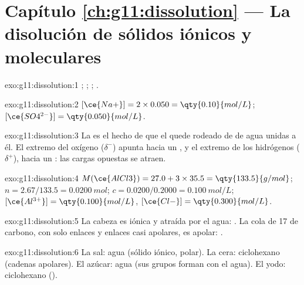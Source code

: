 \section*{Capítulo \ref{ch:g11:dissolution} --- La disolución de sólidos iónicos y moleculares}

\begin{solution}{exo:g11:dissolution:1}
;
;
;
.
\end{solution}

\begin{solution}{exo:g11:dissolution:2}
$[\ce{Na+}] = 2 \times 0.050 = \qty{0.10}{mol/L}$;
$[\ce{SO4^{2-}}] = \qty{0.050}{mol/L}$.
\end{solution}

\begin{solution}{exo:g11:dissolution:3}
La  es el hecho de que el  quede rodeado de  de
agua unidas a él. El extremo del oxígeno ($\delta^-$) apunta hacia un
, y el extremo de los hidrógenos ($\delta^+$), hacia un : las
cargas opuestas se atraen.
\end{solution}

\begin{solution}{exo:g11:dissolution:4}
$M(\ce{AlCl3}) = 27.0 + 3 \times 35.5 = \qty{133.5}{g/mol}$;
$n = 2.67 / 133.5 = \qty{0.0200}{mol}$; $c = 0.0200 / 0.2000 =
\qty{0.100}{mol/L}$; $[\ce{Al^{3+}}] = \qty{0.100}{mol/L}$,
$[\ce{Cl-}] = \qty{0.300}{mol/L}$.
\end{solution}

\begin{solution}{exo:g11:dissolution:5}
La cabeza  es iónica y atraída por el agua: . La cola
de 17  de carbono, con solo enlaces  y enlaces 
casi apolares, es apolar: .
\end{solution}

\begin{solution}{exo:g11:dissolution:6}
La sal: agua (sólido iónico,  polar). La cera: ciclohexano
(cadenas apolares). El azúcar: agua (sus grupos  forman  con el agua). El yodo: ciclohexano ().
\end{solution}

